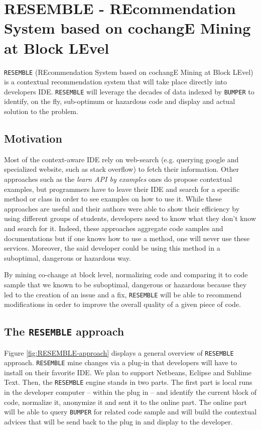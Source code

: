 
\section{RESEMBLE - REcommendation System based on cochangE Mining at Block LEvel\label{sec:RESEMBLE}}

{\tt RESEMBLE} (REcommendation System based on cochangE Mining at Block LEvel) is a contextual recommendation system that will take place directly into developers IDE. {\tt RESEMBLE} will leverage the decades of data indexed by {\tt BUMPER} to identify, on the fly, sub-optimum or hazardous code and display and actual solution to the problem.

\subsection{Motivation}

Most of the context-aware IDE \cite{Brandt2009,JoelBrandt} rely on web-search (e.g. querying google and specialized website, such as stack overflow) to fetch their information.
Other approaches such as the {\it learn API by examples} ones \cite{Kim2011,Montandon2013} do propose contextual examples, but programmers have to leave their IDE and search for a specific method or class in order to see examples on how to use it.
While these approaches are useful and their authors were able to show their efficiency by using different groups of students, developers need to know what they don't know and search for it.
Indeed, these approaches aggregate code samples and documentations but if one knows how to use a method, one will never use these services.
Moreover, the said developer could be using this method in a suboptimal, dangerous or hazardous way.

By mining co-change at block level, normalizing code and comparing it to code sample that we known to be suboptimal, dangerous or hazardous because they led to the creation of an issue and a fix, {\tt RESEMBLE} will be able to recommend modifications in order to improve the overall quality of a given piece of code.

\subsection{The {\tt RESEMBLE} approach}

Figure \ref{fig:RESEMBLE-approach} displays a general overview of {\tt RESEMBLE} approach. {\tt RESEMBLE} mine changes via a plug-in that developers will have to install on their favorite IDE. We plan to support Netbeans, Eclipse and Sublime Text.
Then, the {\tt RESEMBLE} engine stands in two parts. The first part is local runs in the developer computer -- within the plug in -- and identify the current block of code, normalize it, anonymize it and sent it to the online part.
The online part will be able to query {\tt BUMPER} for related code sample and will build the contextual advices that will be send back to the plug in and display to the developer.

